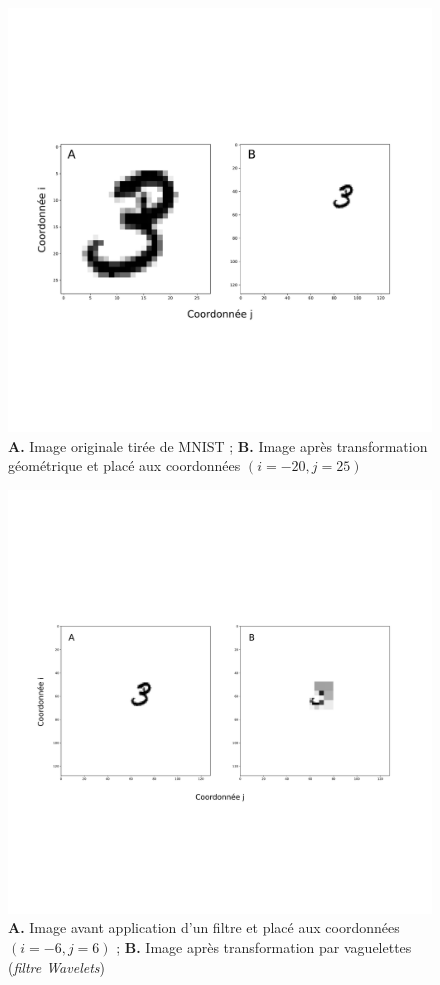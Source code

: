 \begin{figure}[th]
\centering
\includegraphics[scale=0.3]{Figures/mnist_reshape}
\decoRule %
\caption[Figure]{\textbf{A.} Image originale tirée de MNIST ; \textbf{B.} Image après transformation géométrique et placé aux coordonnées $(i=-20,j=25)$}
\label{fig:mnist_reshape}
\end{figure}

\begin{figure}[th]
\centering
\includegraphics[scale=0.3]{Figures/wavelet_effect}
\decoRule %
\caption[Figure]{\textbf{A.} Image avant application d'un filtre et placé aux coordonnées $(i=-6,j=6)$ ; \textbf{B.} Image après transformation par vaguelettes (\textit{filtre Wavelets})}
\label{fig:wavelet_effect}
\end{figure}

